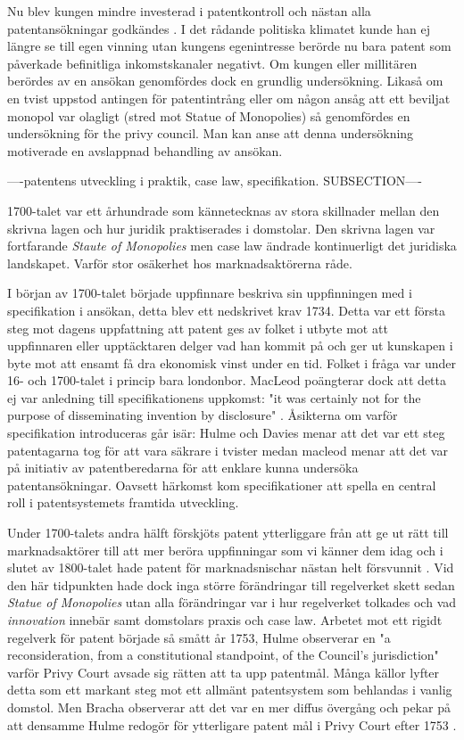 Nu blev kungen mindre investerad i patentkontroll och nästan alla
patentansökningar godkändes \cite{bracha}. I det rådande politiska klimatet kunde han ej längre se till
egen vinning utan kungens egenintresse berörde nu bara patent som påverkade befinitliga inkomstskanaler
negativt\cite{macleod2}. Om kungen eller millitären berördes av en ansökan genomfördes dock en grundlig
undersökning. Likaså om en tvist uppstod antingen för patentintrång eller om någon ansåg att ett beviljat
monopol var olagligt (stred mot Statue of Monopolies) så genomfördes en undersökning för the privy
council\cite{bracha}. Man kan anse att denna undersökning motiverade en avslappnad behandling av ansökan.

----patentens utveckling i praktik, case law, specifikation. SUBSECTION----

1700-talet var ett århundrade som kännetecknas av stora skillnader mellan den skrivna lagen och hur juridik praktiserades i domstolar. Den skrivna lagen var fortfarande \emph{Staute of Monopolies} men case law ändrade kontinuerligt det juridiska landskapet. Varför stor osäkerhet hos marknadsaktörerna råde.

I början av 1700-talet började uppfinnare beskriva sin uppfinningen med i specifikation i ansökan, detta blev ett nedskrivet krav 1734\cite{macleod}. 
Detta var ett första steg mot dagens uppfattning att patent ges av folket i utbyte mot att uppfinnaren eller
upptäcktaren delger vad han kommit på och ger ut kunskapen i byte mot att ensamt få dra ekonomisk vinst
under en tid. Folket i fråga var under 16- och 1700-talet i princip bara londonbor. MacLeod poängterar dock att detta ej var anledning till specifikationens uppkomst: "it was certainly not for the purpose of disseminating invention by disclosure" \cite{macleod2}. Åsikterna om varför specifikation introduceras går isär: Hulme och Davies menar att det var ett steg patentagarna tog för att vara säkrare i tvister medan macleod menar att det var på initiativ av patentberedarna för att enklare kunna undersöka patentansökningar. Oavsett härkomst kom specifikationer att spella en central roll i patentsystemets framtida utveckling.

Under 1700-talets andra hälft förskjöts patent ytterliggare från att ge ut rätt till marknadsaktörer till att mer beröra uppfinningar som vi känner dem idag och i slutet av 1800-talet hade patent för marknadsnischar nästan helt försvunnit \cite{bracha}. 
Vid den här tidpunkten hade dock inga större förändringar till regelverket skett sedan \emph{Statue of Monopolies}
utan alla förändringar var i hur regelverket tolkades och vad \emph{innovation} innebär samt domstolars praxis och case law. Arbetet mot ett rigidt regelverk för patent började så smått år 1753, Hulme \cite{hulme3} observerar en "a reconsideration, from a constitutional standpoint, of the Council’s jurisdiction" varför Privy Court avsade sig rätten att ta upp patentmål. Många källor lyfter detta som ett markant steg mot ett allmänt patentsystem som behlandas i vanlig domstol. Men Bracha observerar att det var en mer diffus övergång och pekar på att densamme Hulme redogör för ytterligare patent mål i Privy Court efter 1753 \cite{bracha}.

